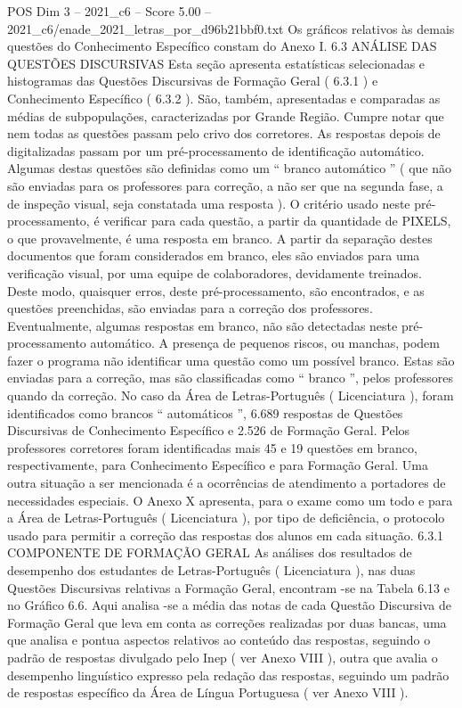 \begin{textsample}{POS Dim 3 – 2021\_c6 – Score 5.00 – 2021\_c6/enade\_2021\_letras\_por\_d96b21bbf0.txt}
Os gráficos relativos às demais questões do Conhecimento Específico constam do Anexo I. 6.3 ANÁLISE DAS QUESTÕES DISCURSIVAS Esta seção apresenta estatísticas selecionadas e histogramas das Questões Discursivas de Formação Geral ( 6.3.1 ) e Conhecimento Específico ( 6.3.2 ).
São, também, apresentadas e comparadas as médias de subpopulações, caracterizadas por Grande Região.
Cumpre notar que nem todas as questões passam pelo crivo dos corretores.
As respostas depois de digitalizadas passam por um pré-processamento de identificação automático.
Algumas destas questões são definidas como um “ branco automático ” ( que não são enviadas para os professores para correção, a não ser que na segunda fase, a de inspeção visual, seja constatada uma resposta ).
O critério usado neste pré-processamento, é verificar para cada questão, a partir da quantidade de PIXELS, o que provavelmente, é uma resposta em branco.
A partir da separação destes documentos que foram considerados em branco, eles são enviados para uma verificação visual, por uma equipe de colaboradores, devidamente treinados.
Deste modo, quaisquer erros, deste pré-processamento, são encontrados, e as questões preenchidas, são enviadas para a correção dos professores.
Eventualmente, algumas respostas em branco, não são detectadas neste pré-processamento automático.
A presença de pequenos riscos, ou manchas, podem fazer o programa não identificar uma questão como um possível branco.
Estas são enviadas para a correção, mas são classificadas como “ branco ”, pelos professores quando da correção.
No caso da Área de Letras-Português ( Licenciatura ), foram identificados como brancos “ automáticos ”, 6.689 respostas de Questões Discursivas de Conhecimento Específico e 2.526 de Formação Geral.
Pelos professores corretores foram identificadas mais 45 e 19 questões em branco, respectivamente, para Conhecimento Específico e para Formação Geral.
Uma outra situação a ser mencionada é a ocorrências de atendimento a portadores de necessidades especiais.
O Anexo X apresenta, para o exame como um todo e para a Área de Letras-Português ( Licenciatura ), por tipo de deficiência, o protocolo usado para permitir a correção das respostas dos alunos em cada situação. 6.3.1 COMPONENTE DE FORMAÇÃO GERAL As análises dos resultados de desempenho dos estudantes de Letras-Português ( Licenciatura ), nas duas Questões Discursivas relativas a Formação Geral, encontram -se na Tabela 6.13 e no Gráfico 6.6.
Aqui analisa -se a média das notas de cada Questão Discursiva de Formação Geral que leva em conta as correções realizadas por duas bancas, uma que analisa e pontua aspectos relativos ao conteúdo das respostas, seguindo o padrão de respostas divulgado pelo Inep ( ver Anexo VIII ), outra que avalia o desempenho linguístico expresso pela redação das respostas, seguindo um padrão de respostas específico da Área de Língua Portuguesa ( ver Anexo VIII ).

\end{textsample}
